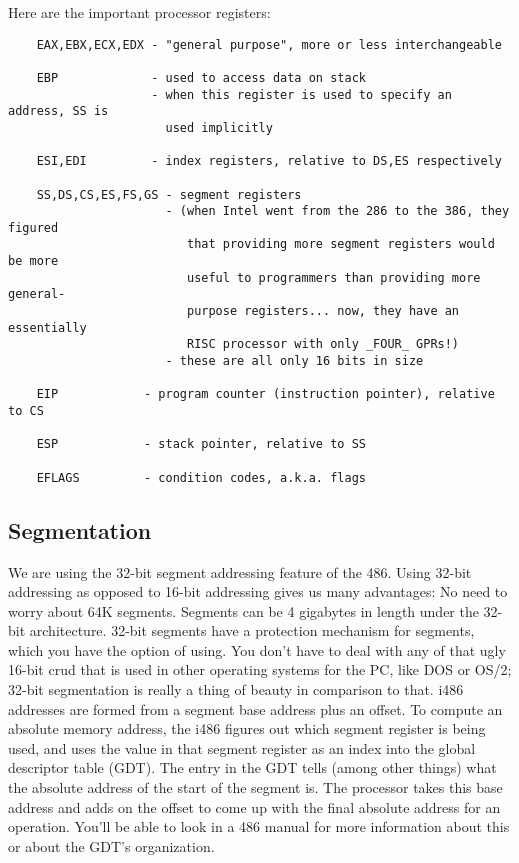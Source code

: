 \documentclass{note}
\begin{document}
{Here are the important processor registers:
\begin{verbatim}
    EAX,EBX,ECX,EDX - "general purpose", more or less interchangeable

    EBP             - used to access data on stack
                    - when this register is used to specify an address, SS is
                      used implicitly

    ESI,EDI         - index registers, relative to DS,ES respectively

    SS,DS,CS,ES,FS,GS - segment registers
                      - (when Intel went from the 286 to the 386, they figured
                         that providing more segment registers would be more
                         useful to programmers than providing more general-
                         purpose registers... now, they have an essentially
                         RISC processor with only _FOUR_ GPRs!)
                      - these are all only 16 bits in size

    EIP            - program counter (instruction pointer), relative to CS

    ESP            - stack pointer, relative to SS

    EFLAGS         - condition codes, a.k.a. flags
\end{verbatim}

\subsection{Segmentation}
We are using the 32-bit segment addressing feature of the 486. Using 32-bit addressing as opposed to 16-bit addressing gives us many advantages:
No need to worry about 64K segments. Segments can be 4 gigabytes in length under the 32-bit architecture.
32-bit segments have a protection mechanism for segments, which you have the option of using.
You don't have to deal with any of that ugly 16-bit crud that is used in other operating systems for the PC, like DOS or OS/2; 32-bit segmentation is really a thing of beauty in comparison to that.
i486 addresses are formed from a segment base address plus an offset. To compute an absolute memory address, the i486 figures out which segment register is being used, and uses the value in that segment register as an index into the global descriptor table (GDT). The entry in the GDT tells (among other things) what the absolute address of the start of the segment is. The processor takes this base address and adds on the offset to come up with the final absolute address for an operation. You'll be able to look in a 486 manual for more information about this or about the GDT's organization.

}
\end{document}
